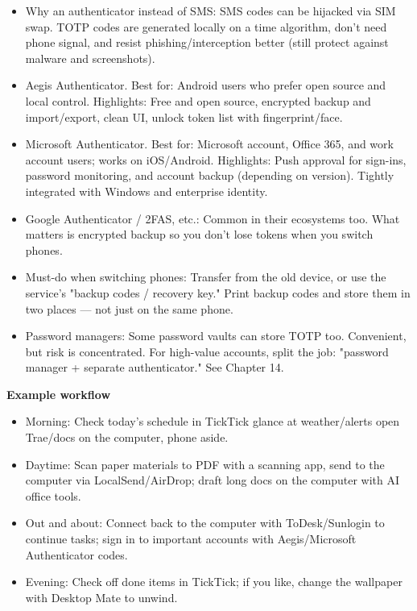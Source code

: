 
\begin{itemize}
  \item Why an authenticator instead of SMS: SMS codes can be hijacked via SIM swap. TOTP codes are generated locally on a time algorithm, don't need phone signal, and resist phishing/interception better (still protect against malware and screenshots).
  \item Aegis Authenticator. Best for: Android users who prefer open source and local control. Highlights: Free and open source, encrypted backup and import/export, clean UI, unlock token list with fingerprint/face.
  \item Microsoft Authenticator. Best for: Microsoft account, Office 365, and work account users; works on iOS/Android. Highlights: Push approval for sign-ins, password monitoring, and account backup (depending on version). Tightly integrated with Windows and enterprise identity.
  \item Google Authenticator / 2FAS, etc.: Common in their ecosystems too. What matters is encrypted backup so you don't lose tokens when you switch phones.
  \item Must-do when switching phones: Transfer from the old device, or use the service's "backup codes / recovery key." Print backup codes and store them in two places — not just on the same phone.
  \item Password managers: Some password vaults can store TOTP too. Convenient, but risk is concentrated. For high-value accounts, split the job: "password manager + separate authenticator." See Chapter 14.
\end{itemize}


\textbf{Example workflow}\par

\begin{itemize}
  \item Morning: Check today's schedule in TickTick glance at weather/alerts open Trae/docs on the computer, phone aside.
  \item Daytime: Scan paper materials to PDF with a scanning app, send to the computer via LocalSend/AirDrop; draft long docs on the computer with AI office tools.
  \item Out and about: Connect back to the computer with ToDesk/Sunlogin to continue tasks; sign in to important accounts with Aegis/Microsoft Authenticator codes.
  \item Evening: Check off done items in TickTick; if you like, change the wallpaper with Desktop Mate to unwind.
\end{itemize}

